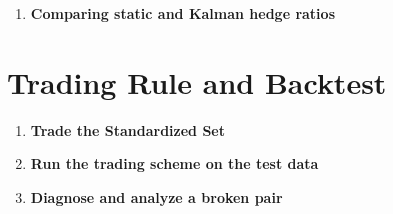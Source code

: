 \documentclass{article}
\begin{document}
\begin{enumerate}
\begin{gather*}
            oe_t = \bs{H}_t\cdot(\hbs{P}_t\bs{H}_t) + R
        \end{gather*}
        and finally the ratio between our state and observation confidence being
        equivalent to the kalman gain $K_t$. 
        \begin{gather*}
            \bs{K}_t = \frac{1}{oe_t}\hbs{P}_t\bs{H}_t
        \end{gather*}
        Using the Kalman gain we can correct our model, we have
        \begin{gather*}
            \bs{\alpha}_t = \hbs{\alpha}_t + \bs{K}_te_t
            \\
            \bs{P}_t = (I - \bs{K}_t\bs{H}_t^T)\hbs{P}_t
        \end{gather*}
        Therefore we have a nice recursion, if we know our Kalman filter
        $\bs{\alpha}_t$ and $\bs{P}_t$ we can always update the filter with
        another timestep following the above scheme. Doing this over, the
        entirety of the given timeseries allows us to find a hedge ratio
        $\beta_t$ which is closer to the true hedge ratio at a given time $t$.
        Note that that Kalman filter can be updated as new data is
        presented and therefore so can our spread. As new data is introduced to
        our system, after updating the hedge-ratio/spread, we have a new
        timestep to fit the SDE. A simple
        recursive least-squares solution is performed to update $\mu, \theta,
        \sigma$. 

        \item \textbf{Comparing static and Kalman hedge ratios}
    \end{enumerate}

    \section{Trading Rule and Backtest}
    \begin{enumerate}
        \item \textbf{Trade the Standardized Set}

        \item \textbf{Run the trading scheme on the test data}

        \item \textbf{Diagnose and analyze a broken pair}
    \end{enumerate}
\end{document}
